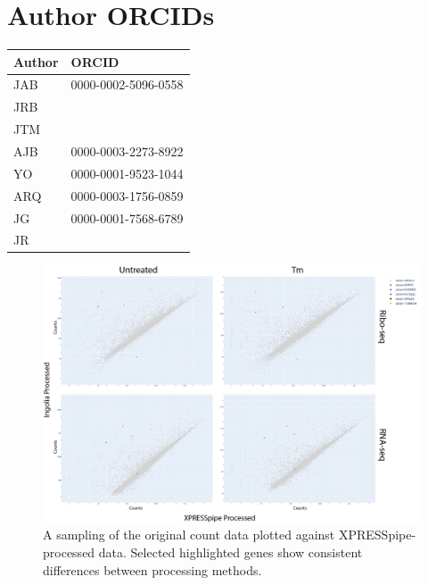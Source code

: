 \documentclass[11pt, a4paper, oneside]{article}
\newcommand{\beginsupplement}{%
  \setcounter{table}{0}
  \renewcommand{\thetable}{S\arabic{table}}%
  \setcounter{figure}{0}
  \renewcommand{\thefigure}{S\arabic{figure}}%
}
\begin{document}
\section*{Author ORCIDs}
\begin{tabular}{p{2.4cm}p{7.5cm}}
 \textbf{Author} & \textbf{ORCID}\\
 \hline
 JAB & 0000-0002-5096-0558 \\
 \hline
 JRB & \\
 \hline
 JTM & \\
 \hline
 AJB & 0000-0003-2273-8922 \\
 \hline
 YO & 0000-0001-9523-1044 \\
 \hline
 ARQ & 0000-0003-1756-0859 \\
 \hline
 JG & 0000-0001-7568-6789 \\
 \hline
 JR & \\
\end{tabular}
\newline





\beginsupplement

\begin{figure}
\centering
  \includegraphics[width=160mm]{figures/xpresspipe_supplement2.png}
  \caption{A sampling of the original count data plotted against XPRESSpipe-processed data. Selected highlighted genes show consistent differences between processing methods.}
  \label{fig:supplement2}
\end{figure}
\end{document}
